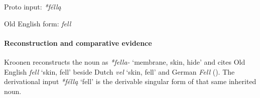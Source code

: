 \documentclass[
  british,
  a4paper,
]{article}
\providecommand{\Recon}[1]{\emph{*#1}}
\begin{document}
Proto input: \emph{*féllą}

\begingroup
\setlength{\fboxsep}{6pt}

\noindent{} \endgroup

Old English form: \emph{fell}

\paragraph{Reconstruction and comparative
evidence}\label{reconstruction-and-comparative-evidence-18}

Kroonen reconstructs the noun as \emph{*fella-} `membrane, skin, hide'
and cites Old English {\emph{fell}} `skin, fell' beside Dutch
{\emph{vel}} `skin, fell' and German \emph{Fell}
(). The derivational input
\Recon{féllą} `fell' is the derivable singular form of that same
inherited noun.
\end{document}
